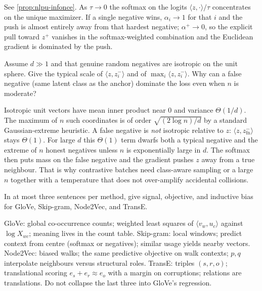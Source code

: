 \begin{solution}
See \cref{prop:nlpu-infonce}. As $\tau\to 0$ the softmax on the logits $\langle z,\cdot\rangle/\tau$ concentrates on the unique maximizer. If a single negative wins, $\alpha_i\to 1$ for that $i$ and the push is almost entirely away from that hardest negative; $\alpha^+\to 0$, so the explicit pull toward $z^+$ vanishes in the softmax-weighted combination and the Euclidean gradient is dominated by the push.
\end{solution}

\begin{exercise}
\label{ex:nlpu-false-neg}
Assume $d\gg 1$ and that genuine random negatives are isotropic on the unit sphere. Give the typical scale of $\langle z,z_i^-\rangle$ and of $\max_i\langle z,z_i^-\rangle$. Why can a false negative (same latent class as the anchor) dominate the loss even when $n$ is moderate?
\end{exercise}

\begin{solution}
Isotropic unit vectors have mean inner product near $0$ and variance $\Theta(1/d)$. The maximum of $n$ such coordinates is of order $\sqrt{(2\log n)/d}$ by a standard Gaussian-extreme heuristic. A false negative is \emph{not} isotropic relative to $z$: $\langle z,z_{\mathrm{fn}}^-\rangle$ stays $\Theta(1)$. For large $d$ this $\Theta(1)$ term dwarfs both a typical negative and the extreme of $n$ honest negatives unless $n$ is exponentially large in $d$. The softmax then puts mass on the false negative and the gradient pushes $z$ away from a true neighbour. That is why contrastive batches need class-aware sampling or a large $n$ together with a temperature that does not over-amplify accidental collisions.
\end{solution}

\begin{exercise}
\label{ex:nlpu-four-emb}
In at most three sentences per method, give signal, objective, and inductive bias for GloVe, Skip-gram, Node2Vec, and TransE.
\end{exercise}

\begin{solution}
GloVe: global co-occurrence counts; weighted least squares of $\langle v_w,u_c\rangle$ against $\log X_{wc}$; meaning lives in the count table. Skip-gram: local windows; predict context from centre (softmax or negatives); similar usage yields nearby vectors. Node2Vec: biased walks; the same predictive objective on walk contexts; $p,q$ interpolate neighbours versus structural roles. TransE: triples $(s,r,o)$; translational scoring $e_s+e_r\approx e_o$ with a margin on corruptions; relations are translations. Do not collapse the last three into GloVe's regression.
\end{solution}


